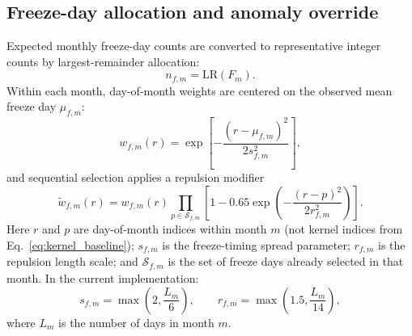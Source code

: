 \documentclass[11pt]{article}
\begin{document}
\subsection{Freeze-day allocation and anomaly override}
Expected monthly freeze-day counts are converted to representative integer counts by largest-remainder allocation:
\begin{equation}
\label{eq:largest_remainder}
n_{f,m}=\mathrm{LR}(F_m).
\end{equation}
Within each month, day-of-month weights are centered on the observed mean freeze day \(\mu_{f,m}\):
\begin{equation}
\label{eq:freeze_weight}
w_{f,m}(r)=\exp\!\left[-\frac{(r-\mu_{f,m})^2}{2s_{f,m}^2}\right],
\end{equation}
and sequential selection applies a repulsion modifier
\begin{equation}
\label{eq:freeze_repulsion}
\tilde w_{f,m}(r)=
w_{f,m}(r)\prod_{p\in\mathcal{S}_{f,m}}
\left[1-0.65\exp\!\left(-\frac{(r-p)^2}{2r_{f,m}^2}\right)\right].
\end{equation}
Here \(r\) and \(p\) are day-of-month indices within month \(m\) (not kernel indices from Eq.~\eqref{eq:kernel_baseline}); \(s_{f,m}\) is the freeze-timing spread parameter; \(r_{f,m}\) is the repulsion length scale; and \(\mathcal{S}_{f,m}\) is the set of freeze days already selected in that month.
In the current implementation:
\[
s_{f,m}=\max\!\left(2,\frac{L_m}{6}\right),\qquad
r_{f,m}=\max\!\left(1.5,\frac{L_m}{14}\right),
\]
where \(L_m\) is the number of days in month \(m\).
\end{document}
